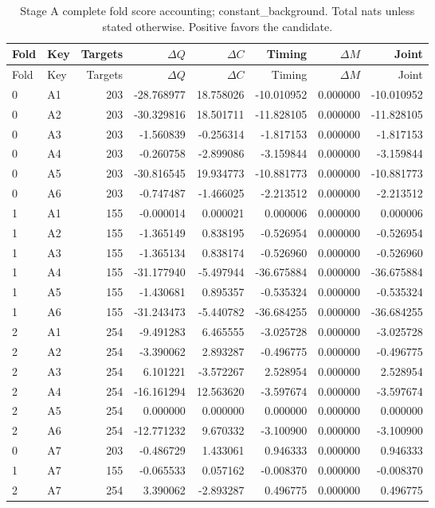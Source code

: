{\small
\setlength{\tabcolsep}{3pt}
\begin{longtable}{llrrrrrr}
\caption{Stage A complete fold score accounting; constant\_background. Total nats unless stated otherwise. Positive favors the candidate.}\label{tab:A-constant_background}\\
\toprule
Fold & Key & Targets & $\Delta Q$ & $\Delta C$ & Timing & $\Delta M$ & Joint\\\midrule
\endfirsthead
\toprule
Fold & Key & Targets & $\Delta Q$ & $\Delta C$ & Timing & $\Delta M$ & Joint\\\midrule
\endhead
0 & A1 & 203 & -28.768977 & 18.758026 & -10.010952 & 0.000000 & -10.010952\\
0 & A2 & 203 & -30.329816 & 18.501711 & -11.828105 & 0.000000 & -11.828105\\
0 & A3 & 203 & -1.560839 & -0.256314 & -1.817153 & 0.000000 & -1.817153\\
0 & A4 & 203 & -0.260758 & -2.899086 & -3.159844 & 0.000000 & -3.159844\\
0 & A5 & 203 & -30.816545 & 19.934773 & -10.881773 & 0.000000 & -10.881773\\
0 & A6 & 203 & -0.747487 & -1.466025 & -2.213512 & 0.000000 & -2.213512\\
1 & A1 & 155 & -0.000014 & 0.000021 & 0.000006 & 0.000000 & 0.000006\\
1 & A2 & 155 & -1.365149 & 0.838195 & -0.526954 & 0.000000 & -0.526954\\
1 & A3 & 155 & -1.365134 & 0.838174 & -0.526960 & 0.000000 & -0.526960\\
1 & A4 & 155 & -31.177940 & -5.497944 & -36.675884 & 0.000000 & -36.675884\\
1 & A5 & 155 & -1.430681 & 0.895357 & -0.535324 & 0.000000 & -0.535324\\
1 & A6 & 155 & -31.243473 & -5.440782 & -36.684255 & 0.000000 & -36.684255\\
2 & A1 & 254 & -9.491283 & 6.465555 & -3.025728 & 0.000000 & -3.025728\\
2 & A2 & 254 & -3.390062 & 2.893287 & -0.496775 & 0.000000 & -0.496775\\
2 & A3 & 254 & 6.101221 & -3.572267 & 2.528954 & 0.000000 & 2.528954\\
2 & A4 & 254 & -16.161294 & 12.563620 & -3.597674 & 0.000000 & -3.597674\\
2 & A5 & 254 & 0.000000 & 0.000000 & 0.000000 & 0.000000 & 0.000000\\
2 & A6 & 254 & -12.771232 & 9.670332 & -3.100900 & 0.000000 & -3.100900\\
0 & A7 & 203 & -0.486729 & 1.433061 & 0.946333 & 0.000000 & 0.946333\\
1 & A7 & 155 & -0.065533 & 0.057162 & -0.008370 & 0.000000 & -0.008370\\
2 & A7 & 254 & 3.390062 & -2.893287 & 0.496775 & 0.000000 & 0.496775\\
\bottomrule
\end{longtable}
}

